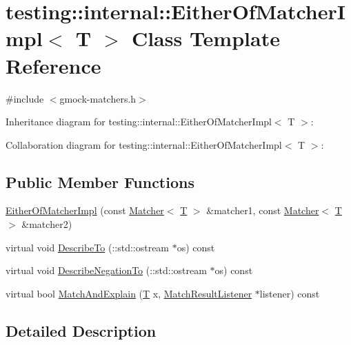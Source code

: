 \hypertarget{classtesting_1_1internal_1_1_either_of_matcher_impl}{}\section{testing\+:\+:internal\+:\+:Either\+Of\+Matcher\+Impl$<$ T $>$ Class Template Reference}
\label{classtesting_1_1internal_1_1_either_of_matcher_impl}


{\ttfamily \#include $<$gmock-\/matchers.\+h$>$}



Inheritance diagram for testing\+:\+:internal\+:\+:Either\+Of\+Matcher\+Impl$<$ T $>$\+:


Collaboration diagram for testing\+:\+:internal\+:\+:Either\+Of\+Matcher\+Impl$<$ T $>$\+:
\subsection*{Public Member Functions}
\begin{DoxyCompactItemize}
\item 
\hyperlink{classtesting_1_1internal_1_1_either_of_matcher_impl_af7008f5d8f2950fbe75e6ff9b78af584}{Either\+Of\+Matcher\+Impl} (const \hyperlink{classtesting_1_1_matcher}{Matcher}$<$ \hyperlink{functions__7_8js_adf1f3edb9115acb0a1e04209b7a9937b}{T} $>$ \&matcher1, const \hyperlink{classtesting_1_1_matcher}{Matcher}$<$ \hyperlink{functions__7_8js_adf1f3edb9115acb0a1e04209b7a9937b}{T} $>$ \&matcher2)
\item 
virtual void \hyperlink{classtesting_1_1internal_1_1_either_of_matcher_impl_a0048ea61b3b093603ecdf51006b4d404}{Describe\+To} (\+::std\+::ostream $\ast$os) const 
\item 
virtual void \hyperlink{classtesting_1_1internal_1_1_either_of_matcher_impl_aba8090d2131a07bb7dcb91e7e2602366}{Describe\+Negation\+To} (\+::std\+::ostream $\ast$os) const 
\item 
virtual bool \hyperlink{classtesting_1_1internal_1_1_either_of_matcher_impl_af662eda6c0499fa92a00caa6de019090}{Match\+And\+Explain} (\hyperlink{functions__7_8js_adf1f3edb9115acb0a1e04209b7a9937b}{T} x, \hyperlink{classtesting_1_1_match_result_listener}{Match\+Result\+Listener} $\ast$listener) const 
\end{DoxyCompactItemize}


\subsection{Detailed Description}
